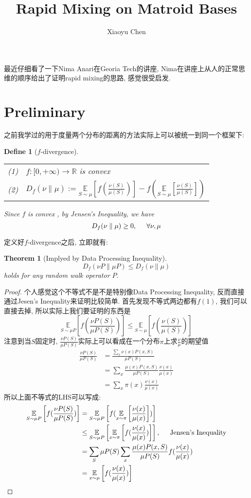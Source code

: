 \documentclass{article}
\title{Rapid Mixing on Matroid Bases}
\author{Xiaoyu Chen}
\date{}
\newtheorem{theorem}{Theorem}
\newtheorem{define}{Define}
\def\~{\sim}
\def\R{\mathbb{R}}
\def\E_#1#2{\underset{#1}{\mathbb{E}}\left[#2\right]}
\begin{document}
\maketitle
最近仔细看了一下Nima Anari在Georia Tech的讲座, 
Nima在讲座上从人的正常思维的顺序给出了证明rapid mixing的思路,
感觉很受启发.

\section{Preliminary}
之前我学过的用于度量两个分布的距离的方法实际上可以被统一到同一个框架下:
\begin{define}[$f$-divergence]
 \ %
  
 \begin{tabular}{l l}
   (1) & $f: [0, +\infty) \to \R$ is convex \\
   (2) & $\displaystyle D_f(\nu\parallel\mu) := \E_{S\~\mu}{f(\frac{\nu(S)}{\mu(S)})} - f\left(\E_{S\~\mu}{\frac{\nu(S)}{\mu(S)}}\right)$
 \end{tabular}

  Since $f$ is convex , by Jensen's Inequality, we have
  \[D_f(\nu\parallel\mu) \geq 0, \hspace{0.5cm} \forall \nu, \mu\]
\end{define}

{\flushleft 定义好$f$-divergence之后, 立即就有: }
\begin{theorem}[Implyed by Data Processing Inequality]
  \[D_f(\nu P \parallel \mu P) \leq D_f(\nu \parallel \mu)\]
  holds for any random walk operator $P$.
\end{theorem}
\begin{proof}[Proof]
  个人感觉这个不等式不是不是特别像Data Processing Inequality, 反而直接通过Jesen's Inequality来证明比较简单.
  首先发现不等式两边都有$f(1)$, 我们可以直接去掉, 所以实际上我们要证明的东西是
  \[\E_{S\~\mu P}{f(\frac{\nu P(S)}{\mu P(S)})} \leq \E_{S\~\mu}{f(\frac{\nu(S)}{\mu(S)})}\]
  注意到当$S$固定时, $\frac{\nu P(S)}{\mu P(S)}$实际上可以看成在一个分布$\pi$上求$\frac{\nu}{\mu}$的期望值
  \begin{align*}
    \frac{\nu P(S)}{\mu P(S)}
    &= \frac{\sum_{x} \nu(x) P(x, S)}{\mu P(S)} \\
    &= \sum_x\frac{\mu(x) P(x, S) }{\mu P(S)} \frac{\nu(x)}{\mu(x)}\\
    &= \sum_{x} \pi(x) \frac{\nu(x)}{\mu(x)}
  \end{align*}
  所以上面不等式的LHS可以写成:
  \begin{align*}
    \E_{S\~\mu P}{f(\frac{\nu P(S)}{\mu P(S)})}
    &= \E_{S\~\mu P}{f(\E_{x\~\pi}{\frac{\nu(x)}{\mu(x)}})} \\
    &\leq \E_{S\~\mu P}{\E_{x\~\pi}{f(\frac{\nu(x)}{\mu(x)})}}, \hspace{0.5cm} \mbox{Jensen's Inequality} \\
    &= \sum_{S} \mu P(S) \sum_{x} \frac{\mu(x)P(x,S)}{\mu P(S)} f(\frac{\nu(x)}{\mu(x)}) \\
    &= \E_{x\~\mu}{f(\frac{\nu(x)}{\mu(x)})} \qedhere
  \end{align*}
\end{proof}
\end{document}
